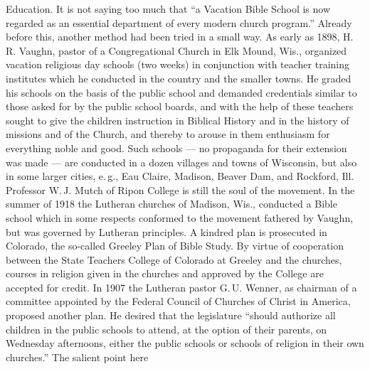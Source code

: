 Education. It is not saying too much that “a Vacation Bible School is now regarded as an essential department of every modern church program.” Already before this, another method had been tried in a small way. As early as 1898, H.\,R. Vaughn, pastor of a Congregational Church in Elk Mound, Wis., organized vacation religious day schools (two weeks) in conjunction with teacher training institutes which he conducted in the country and the smaller towns. He graded his schools on the basis of the public school and demanded credentials similar to those asked for by the public school boards, and with the help of these teachers sought to give the children instruction in Biblical History and in the history of missions and of the Church, and thereby to arouse in them enthusiasm for everything noble and good. Such schools — no propaganda for their extension was made — are conducted in a dozen villages and towns of Wisconsin, but also in some larger cities, e.\,g., Eau Claire, Madison, Beaver Dam, and Rockford, Ill. Professor W.\,J. Mutch of Ripon College is still the soul of the movement. In the summer of 1918 the Lutheran churches of Madison, Wis., conducted a Bible school which in some respects conformed to the movement fathered by Vaughn, but was governed by Lutheran principles. A kindred plan is prosecuted in Colorado, the so-called Greeley Plan of Bible Study. By virtue of cooperation between the State Teachers College of Colorado at Greeley and the churches, courses in religion given in the churches and approved by the College are accepted for credit. In 1907 the Lutheran pastor G.\,U. Wenner, as chairman of a committee appointed by the Federal Council of Churches of Christ in America, proposed another plan. He desired that the legislature “should authorize all children in the public schools to attend, at the option of their parents, on Wednesday afternoons, either the public schools or schools of religion in their own churches.” The salient point here
